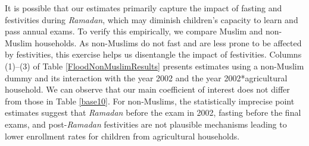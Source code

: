 \documentclass[12pt,letterpaper]{article}
\newcommand{\0}{\ensuremath{\mbox{\boldmath $0$}}}
\begin{document}
It is possible that our estimates primarily capture the impact of fasting and festivities during \textit{Ramadan}, which may diminish children’s capacity to learn and pass annual exams. To verify this empirically, we compare Muslim and non-Muslim households. As non-Muslims do not fast and are less prone to be affected by festivities, this exercise helps us disentangle the impact of festivities. Columns (1)–(3) of Table \ref{FloodNonMuslimResults} presents estimates using a non-Muslim dummy and its interaction with the year 2002 and the year 2002*agricultural household. We can observe that our main coefficient of interest does not differ from those in Table \ref{base10}. For non-Muslims, the statistically imprecise point estimates suggest that \textit{Ramadan} before the exam in 2002, fasting before the final exams, and post-\textit{Ramadan} festivities are not plausible mechanisms leading to lower enrollment rates for children from agricultural households.


\end{document}
